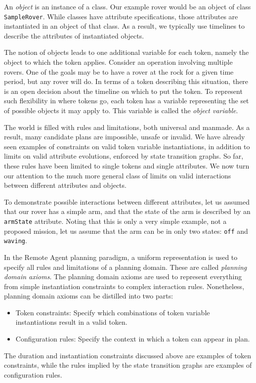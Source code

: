 An {\em object} is an instance of a class.  Our example rover would be
an object of class {\tt SampleRover}.  While classes have attribute
specifications, those attributes are instantiated in an object of that
class.  As a result, we typically use timelines to describe the
attributes of instantiated objects.

The notion of objects leads to one additional variable for each token,
namely the object to which the token applies.  Consider an operation
involving multiple rovers.  One of the goals may be to have a rover at
the rock for a given time period, but any rover will do.  In terms of
a token describing this situation, there is an open decision about the
timeline on which to put the token.  To represent such flexibility in
where tokens go, each token has a variable representing the set of
possible objects it may apply to.  This variable is called the {\em
object variable}.





The world is filled with rules and limitations, both universal and
manmade.  As a result, many candidate plans are impossible,
unsafe or invalid.  We have already seen examples of constraints on
valid token variable instantiations, in addition to limits on valid
attribute evolutions, enforced by state transition graphs.  So far,
these rules have been limited to single tokens and single attributes.
We now turn our attention to the much more general class of limits on
valid interactions between different attributes and objects.  

To demonstrate possible interactions between different attributes, let
us assumed that our rover has a simple arm, and that the state of the
arm is described by an {\tt armState} attribute.  Noting that this is
only a very simple example, not a proposed mission, let us assume that
the arm can be in only two states: {\tt off} and {\tt waving}.

In the Remote Agent planning paradigm, a uniform representation is
used to specify all rules and limitations of a planning domain.  These
are called {\em planning domain axioms}.  The planning domain axioms
are used to represent everything from simple instantiation constraints
to complex interaction rules.  Nonetheless, planning domain axioms can
be distilled into two parts:
  \begin{itemize}
  \item Token constraints:  Specify which combinations of token
variable instantiations result in a valid token.
  \item Configuration rules: Specify the context in which a token can
appear in plan.
  \end{itemize}
  The duration and instantiation constraints discussed above are
examples of token constraints, while the rules implied by the state
transition graphs are examples of configuration rules.

